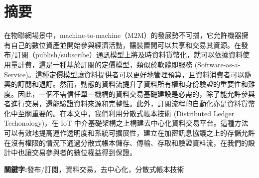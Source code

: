 \begin{center}
\vspace{0.5cm}


\end{center}
\restoregeometry
\clearpage
{}

\newpage
{}
\thispagestyle{empty}

\clearpage

\clearpage

\setcounter{page}{1}
\newpage
{}
\chapter*{摘要}
\pagestyle{plain}

\begin{spacing}{2.0}

在物聯網場景中，machine-to-machine（M2M）的發展勢不可擋，它允許機器擁有自己的數位資產並開始參與經濟活動，讓裝置間可以共享和交易其資源。在發布/訂閱（publish/subscribe）通訊模型上將及時資料貨幣化，就可以依據資料使用量計費，這是一種基於訂閱的定價模型，類似於軟體即服務 (Software-as-a-Service)。這種定價模型讓資料提供者可以更好地管理預算，且資料消費者可以隨興的訂閱和退訂。然而，動態的資料流提升了資料所有權和身份驗證的重要性和難度。因此，一個不需信任單一機構的資料交易基礎建設是必需的，除了能允許參與者進行交易，還能驗證資料來源和完整性。此外，訂閱流程的自動化亦是資料貨幣化中至關重要的。在本文中，我們利用分散式帳本技術 (Distributed Ledger Techonology)，在 IoT 中介基礎架構之上構建去中心化資料交易平台。這種方法可以有效地提高運作透明度和系統可擴展性，建立在加密訊息協議之上的存儲允許在沒有權限的情況下通過分散式帳本儲存、傳輸、存取和驗證資料流，在我們的設計中也讓交易參與者的數位權益得到保證。

\end{spacing}

\par{\noindent \bf 關鍵字:}{發布/訂閱，資料交易，去中心化，分散式帳本技術}
\clearpage
{}

